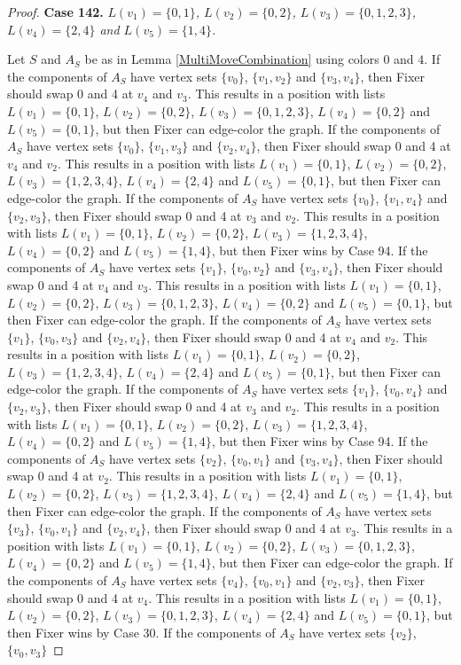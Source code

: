 \documentclass[12pt]{amsart}
\theoremstyle{plain}
\theoremstyle{definition}
\theoremstyle{remark}
\begin{document}
\begin{proof}
\noindent\textbf{Case 142.  }\textit{$L(v_1) = \{0, 1\}$, $L(v_2) = \{0, 2\}$, $L(v_3) = \{0, 1, 2, 3\}$, $L(v_4) = \{2, 4\}$ and $L(v_5) = \{1, 4\}$.}

Let $S$ and $A_S$ be as in Lemma \ref{MultiMoveCombination} using colors $0$ and $4$. If the components of $A_S$ have vertex sets $\{v_0\}$, $\{v_1, v_2\}$ and $\{v_3, v_4\}$, then Fixer should swap 0 and 4 at $v_4$ and $v_3$. This results in a position with lists $L(v_1) = \{0, 1\}$, $L(v_2) = \{0, 2\}$, $L(v_3) = \{0, 1, 2, 3\}$, $L(v_4) = \{0, 2\}$ and $L(v_5) = \{0, 1\}$, but then Fixer can edge-color the graph. If the components of $A_S$ have vertex sets $\{v_0\}$, $\{v_1, v_3\}$ and $\{v_2, v_4\}$, then Fixer should swap 0 and 4 at $v_4$ and $v_2$. This results in a position with lists $L(v_1) = \{0, 1\}$, $L(v_2) = \{0, 2\}$, $L(v_3) = \{1, 2, 3, 4\}$, $L(v_4) = \{2, 4\}$ and $L(v_5) = \{0, 1\}$, but then Fixer can edge-color the graph. If the components of $A_S$ have vertex sets $\{v_0\}$, $\{v_1, v_4\}$ and $\{v_2, v_3\}$, then Fixer should swap 0 and 4 at $v_3$ and $v_2$. This results in a position with lists $L(v_1) = \{0, 1\}$, $L(v_2) = \{0, 2\}$, $L(v_3) = \{1, 2, 3, 4\}$, $L(v_4) = \{0, 2\}$ and $L(v_5) = \{1, 4\}$, but then Fixer wins by Case 94. If the components of $A_S$ have vertex sets $\{v_1\}$, $\{v_0, v_2\}$ and $\{v_3, v_4\}$, then Fixer should swap 0 and 4 at $v_4$ and $v_3$. This results in a position with lists $L(v_1) = \{0, 1\}$, $L(v_2) = \{0, 2\}$, $L(v_3) = \{0, 1, 2, 3\}$, $L(v_4) = \{0, 2\}$ and $L(v_5) = \{0, 1\}$, but then Fixer can edge-color the graph. If the components of $A_S$ have vertex sets $\{v_1\}$, $\{v_0, v_3\}$ and $\{v_2, v_4\}$, then Fixer should swap 0 and 4 at $v_4$ and $v_2$. This results in a position with lists $L(v_1) = \{0, 1\}$, $L(v_2) = \{0, 2\}$, $L(v_3) = \{1, 2, 3, 4\}$, $L(v_4) = \{2, 4\}$ and $L(v_5) = \{0, 1\}$, but then Fixer can edge-color the graph. If the components of $A_S$ have vertex sets $\{v_1\}$, $\{v_0, v_4\}$ and $\{v_2, v_3\}$, then Fixer should swap 0 and 4 at $v_3$ and $v_2$. This results in a position with lists $L(v_1) = \{0, 1\}$, $L(v_2) = \{0, 2\}$, $L(v_3) = \{1, 2, 3, 4\}$, $L(v_4) = \{0, 2\}$ and $L(v_5) = \{1, 4\}$, but then Fixer wins by Case 94. If the components of $A_S$ have vertex sets $\{v_2\}$, $\{v_0, v_1\}$ and $\{v_3, v_4\}$, then Fixer should swap 0 and 4 at $v_2$. This results in a position with lists $L(v_1) = \{0, 1\}$, $L(v_2) = \{0, 2\}$, $L(v_3) = \{1, 2, 3, 4\}$, $L(v_4) = \{2, 4\}$ and $L(v_5) = \{1, 4\}$, but then Fixer can edge-color the graph. If the components of $A_S$ have vertex sets $\{v_3\}$, $\{v_0, v_1\}$ and $\{v_2, v_4\}$, then Fixer should swap 0 and 4 at $v_3$. This results in a position with lists $L(v_1) = \{0, 1\}$, $L(v_2) = \{0, 2\}$, $L(v_3) = \{0, 1, 2, 3\}$, $L(v_4) = \{0, 2\}$ and $L(v_5) = \{1, 4\}$, but then Fixer can edge-color the graph. If the components of $A_S$ have vertex sets $\{v_4\}$, $\{v_0, v_1\}$ and $\{v_2, v_3\}$, then Fixer should swap 0 and 4 at $v_4$. This results in a position with lists $L(v_1) = \{0, 1\}$, $L(v_2) = \{0, 2\}$, $L(v_3) = \{0, 1, 2, 3\}$, $L(v_4) = \{2, 4\}$ and $L(v_5) = \{0, 1\}$, but then Fixer wins by Case 30. If the components of $A_S$ have vertex sets $\{v_2\}$, $\{v_0, v_3\}$ 
\end{proof}
\end{document}

